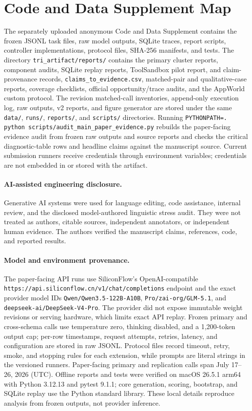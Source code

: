 \documentclass[10pt]{article}
\begin{document}
\section{Code and Data Supplement Map}
\enlargethispage{2\baselineskip}
The separately uploaded anonymous Code and Data Supplement contains the frozen JSONL task files, raw model outputs,
SQLite traces, report scripts, controller implementations, protocol files, SHA-256 manifests,
and tests. The directory \texttt{tri\_artifact/reports/} contains the primary
cluster reports, component audits, SQLite replay reports, ToolSandbox pilot report, and
claim-provenance records, \texttt{claims\_to\_evidence.csv}, matched-pair and qualitative-case reports, coverage checklists,
official opportunity/trace audits, and the AppWorld custom protocol.
The revision matched-call inventories, append-only execution log, raw outputs, v2 reports, and
figure generator are stored under the same \texttt{data/}, \texttt{runs/}, \texttt{reports/}, and
\texttt{scripts/} directories.
Running \texttt{PYTHONPATH=. python scripts/audit\_main\_paper\_evidence.py} rebuilds the
paper-facing evidence audit from frozen raw outputs and source reports and checks the critical
diagnostic-table rows and headline claims against the manuscript source.
Current submission runners receive credentials through environment
variables; credentials are not embedded in or stored with the artifact.

\paragraph{AI-assisted engineering disclosure.}
Generative AI systems were used for language editing, code assistance, internal review, and the
disclosed model-authored linguistic stress audit. They
were not treated as authors, citable sources, independent annotators, or independent human
evidence. The authors verified the manuscript claims, references, code, and reported results.

\paragraph{Model and environment provenance.}
The paper-facing API runs use SiliconFlow's OpenAI-compatible
\texttt{https://api.siliconflow.cn/v1/chat/completions} endpoint and the exact provider model IDs
\texttt{Qwen/Qwen3.5-122B-A10B}, \texttt{Pro/zai-org/GLM-5.1}, and
\texttt{deepseek-ai/DeepSeek-V4-Pro}. The provider did not expose immutable weight revisions or
serving hardware, which limits exact API replay. Frozen primary and cross-schema calls use temperature zero,
thinking disabled, and a 1,200-token output cap; per-row timestamps, request attempts, retries,
latency, and configuration are stored in raw JSONL. Protocol files record timeout, retry, smoke,
and stopping rules for each extension, while prompts are literal strings in the versioned
runners. Paper-facing primary and replication calls span July 17--26, 2026 (UTC). Offline reports
and tests were verified on macOS 26.5.1 arm64 with Python 3.12.13 and
pytest 9.1.1; core generation, scoring, bootstrap, and SQLite replay use the Python standard
library. These local details reproduce analysis from frozen outputs, not provider inference.



\end{document}
